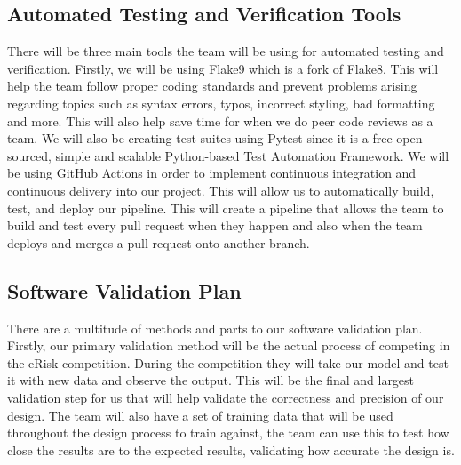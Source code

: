 \documentclass[12pt, titlepage]{article}
\begin{document}
  
  \subsection{Automated Testing and Verification Tools} \label{Automated Testing and Verification Tools}

  There will be three main tools the team will be using for automated testing and verification. Firstly, we will be using Flake9 which is a fork of Flake8. This will help the team follow proper coding standards and prevent problems arising regarding topics such as syntax errors, typos, incorrect styling, bad formatting and more. This will also help save time for when we do peer code reviews as a team. We will also be creating test suites using Pytest since it is a free open-sourced, simple and scalable Python-based Test Automation Framework. We will be using GitHub Actions in order to implement continuous integration and continuous delivery into our project. This will allow us to automatically build, test, and deploy our pipeline. This will create a pipeline that allows the team to build and test every pull request when they happen and also when the team deploys and merges a pull request onto another branch.
  
  \subsection{Software Validation Plan} \label{Software Validation Plan}
  
  There are a multitude of methods and parts to our software validation plan. Firstly, our primary validation method will be the actual process of competing in the eRisk competition. During the competition they will take our model and test it with new data and observe the output. This will be the final and largest validation step for us that will help validate the correctness and precision of our design. The team will also have a set of training data that will be used throughout the design process to train against, the team can use this to test how close the results are to the expected results, validating how accurate the design is. \\
\end{document}
